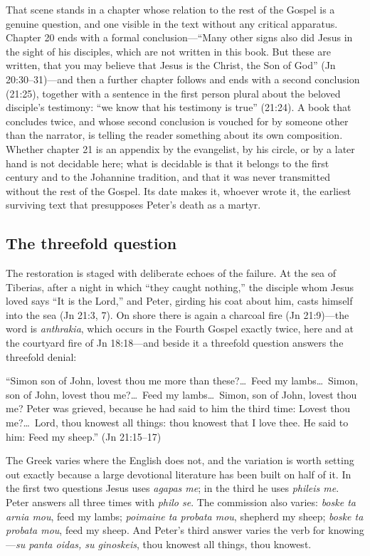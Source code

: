 That scene stands in a chapter whose relation to the rest of the Gospel is a
genuine question, and one visible in the text without any critical apparatus.
Chapter 20 ends with a formal conclusion---``Many other signs also did Jesus
in the sight of his disciples, which are not written in this book. But these
are written, that you may believe that Jesus is the Christ, the Son of
God'' (Jn 20:30--31)---and then a further chapter follows and ends with a
second conclusion (21:25), together with a sentence in the first person
plural about the beloved disciple's testimony: ``we know that his testimony
is true'' (21:24). A book that concludes twice, and whose second conclusion
is vouched for by someone other than the narrator, is telling the reader
something about its own composition. Whether chapter 21 is an appendix by the
evangelist, by his circle, or by a later hand is not decidable here; what is
decidable is that it belongs to the first century and to the Johannine
tradition, and that it was never transmitted without the rest of the Gospel.
Its date makes it, whoever wrote it, the earliest surviving text that
presupposes Peter's death as a martyr.

\subsection{The threefold question}

The restoration is staged with deliberate echoes of the failure. At the sea
of Tiberias, after a night in which ``they caught nothing,'' the disciple
whom Jesus loved says ``It is the Lord,'' and Peter, girding his coat about
him, casts himself into the sea (Jn 21:3, 7). On shore there is again a
charcoal fire (Jn 21:9)---the word is \textit{anthrakia}, which occurs in the
Fourth Gospel exactly twice, here and at the courtyard fire of Jn 18:18---and
beside it
a threefold question answers the threefold denial:

\begin{studyframe}\small
``Simon son of John, lovest thou me more than these?\ldots\ Feed my
lambs\ldots\ Simon, son of John, lovest thou me?\ldots\ Feed my
lambs\ldots\ Simon, son of John, lovest thou me? Peter was grieved, because
he had said to him the third time: Lovest thou me?\ldots\ Lord, thou
knowest all things: thou knowest that I love thee. He said to him: Feed my
sheep.'' (Jn 21:15--17)
\end{studyframe}

The Greek varies where the English does not, and the variation is worth
setting out exactly because a large devotional literature has been built on
half of it. In the first two questions Jesus uses \textit{agapas me}; in the
third he uses \textit{phileis me}. Peter answers all three times with
\textit{philo se}. The commission also varies: \textit{boske ta arnia mou},
feed my lambs; \textit{poimaine ta probata mou}, shepherd my sheep;
\textit{boske ta probata mou}, feed my sheep. And Peter's third answer varies
the verb for knowing---\textit{su panta oidas, su ginoskeis}, thou knowest
all things, thou knowest.

